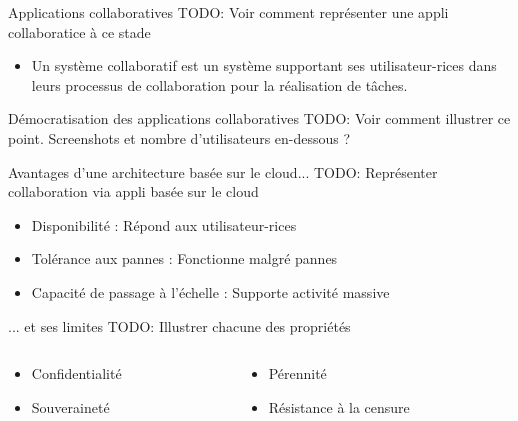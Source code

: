 \begin{frame}{Applications collaboratives}
    TODO: Voir comment représenter une appli collaboratice à ce stade
    \begin{itemize}
        \item Un \alert{système collaboratif} est un système supportant ses utilisateur-rices dans leurs processus de collaboration pour la réalisation de tâches.
    \end{itemize}
\end{frame}

\begin{frame}{Démocratisation des applications collaboratives}
    TODO: Voir comment illustrer ce point.
    Screenshots et nombre d'utilisateurs en-dessous ?
\end{frame}

\begin{frame}{Avantages d'une architecture basée sur le cloud...}
    TODO: Représenter collaboration via appli basée sur le cloud
    \begin{itemize}
        \item \alert{Disponibilité} : Répond aux utilisateur-rices
        \item \alert{Tolérance aux pannes} : Fonctionne malgré pannes
        \item \alert{Capacité de passage à l'échelle} : Supporte activité massive
    \end{itemize}
\end{frame}

\begin{frame}{... et ses limites}
    TODO: Illustrer chacune des propriétés
    \begin{columns}
        \begin{column}{0.5\columnwidth}
            \begin{itemize}
                \item Confidentialité
                \item Souveraineté
            \end{itemize}
        \end{column}
        \begin{column}{0.5\columnwidth}
            \begin{itemize}
                \item Pérennité
                \item Résistance à la censure
            \end{itemize}
        \end{column}
    \end{columns}
\end{frame}

